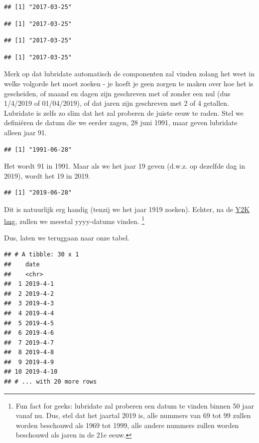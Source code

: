 \documentclass[]{tufte-book}
\begin{document}
\begin{verbatim}
## [1] "2017-03-25"
\end{verbatim}

\begin{verbatim}
## [1] "2017-03-25"
\end{verbatim}

\begin{verbatim}
## [1] "2017-03-25"
\end{verbatim}

\begin{verbatim}
## [1] "2017-03-25"
\end{verbatim}

Merk op dat lubridate automatisch de componenten zal vinden zolang het weet in welke volgorde het moet zoeken - je hoeft je geen zorgen te maken over hoe het is gescheiden, of maand en dagen zijn geschreven met of zonder een nul (dus 1/4/2019 of 01/04/2019), of dat jaren zijn geschreven met 2 of 4 getallen. Lubridate is zelfs zo slim dat het zal proberen de juiste eeuw te raden. Stel we definiëren de datum die we eerder zagen, 28 juni 1991, maar geven lubridate alleen jaar 91.

\begin{verbatim}
## [1] "1991-06-28"
\end{verbatim}

Het wordt 91 in 1991. Maar als we het jaar 19 geven (d.w.z. op dezelfde dag in 2019), wordt het 19 in 2019.

\begin{verbatim}
## [1] "2019-06-28"
\end{verbatim}

Dit is natuurlijk erg handig (tenzij we het jaar 1919 zoeken). Echter, na de \href{https://www.britannica.com/technology/Y2K-bug}{Y2K bug}, zullen we meestal yyyy-datums vinden. \footnote{Fun fact for geeks: lubridate zal proberen een datum te vinden binnen 50 jaar vanaf nu. Dus, stel dat het jaartal 2019 is, alle nummers van 69 tot 99 zullen worden beschouwd als 1969 tot 1999, alle andere nummers zullen worden beschouwd als jaren in de 21e eeuw.}

Dus, laten we teruggaan naar onze tabel.

\begin{verbatim}
## # A tibble: 30 x 1
##    date     
##    <chr>    
##  1 2019-4-1 
##  2 2019-4-2 
##  3 2019-4-3 
##  4 2019-4-4 
##  5 2019-4-5 
##  6 2019-4-6 
##  7 2019-4-7 
##  8 2019-4-8 
##  9 2019-4-9 
## 10 2019-4-10
## # ... with 20 more rows
\end{verbatim}
\end{document}
